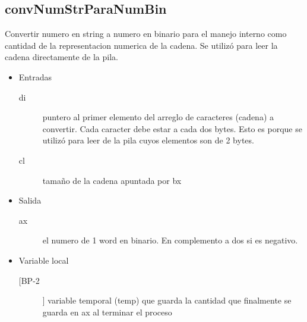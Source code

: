 \subsection{convNumStrParaNumBin}
\label{sec-2-4}
Convertir numero en string a numero en binario para el manejo interno
como cantidad de la representacion numerica de la cadena. Se utilizó
para leer la cadena directamente de la pila.

\begin{itemize}
\item Entradas
\begin{description}
\item[di] puntero al primer elemento del arreglo de caracteres
(cadena) a convertir. Cada caracter debe estar a cada dos
bytes. Esto es porque se utilizó para leer de la pila cuyos
elementos son de 2 bytes.

\item[cl] tamaño de la cadena apuntada por bx
\end{description}

\item Salida
\begin{description}
\item[ax] el numero de 1 word en binario. En complemento a dos si es
negativo.
\end{description}

\item Variable local
\begin{description}
\item[[BP-2]] variable temporal (temp) que guarda la cantidad que
finalmente se guarda en ax al terminar el proceso
\end{description}
\end{itemize}

